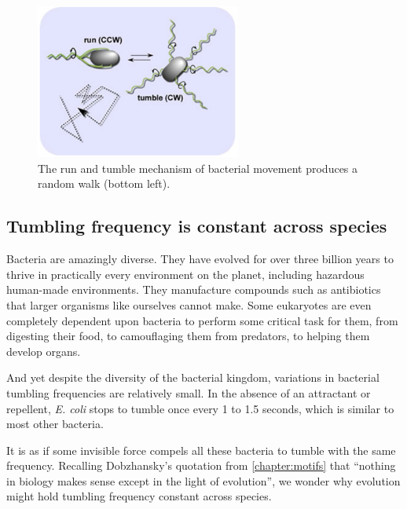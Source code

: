 \begin{figure}[h]
\centering
\mySfFamily
\includegraphics[width = 0.6\textwidth]{../images/chemotaxis_intro_runtumble.png}
\caption{The run and tumble mechanism of bacterial movement produces a random walk (bottom left).}
\label{fig:chemotaxis_intro_runtumble}
\end{figure}

\begin{qbox}\end{qbox}

\FloatBarrier
{}
\subsection{Tumbling frequency is constant across species}

Bacteria are amazingly diverse. They have evolved for over three billion years to thrive in practically every environment on the planet, including hazardous human-made environments. They manufacture compounds such as antibiotics that larger organisms like ourselves cannot make. Some eukaryotes are even completely dependent upon bacteria to perform some critical task for them, from digesting their food, to camouflaging them from predators, to helping them develop organs.

And yet despite the diversity of the bacterial kingdom, variations in bacterial tumbling frequencies are relatively small. In the absence of an attractant or repellent, \textit{E. coli} stops to tumble once every 1 to 1.5 seconds, which is similar to most other bacteria.

It is as if some invisible force compels all these bacteria to tumble with the same frequency. Recalling Dobzhansky's quotation from \autoref{chapter:motifs} that ``nothing in biology makes sense except in the light of evolution'', we wonder why evolution might hold tumbling frequency constant across species.


